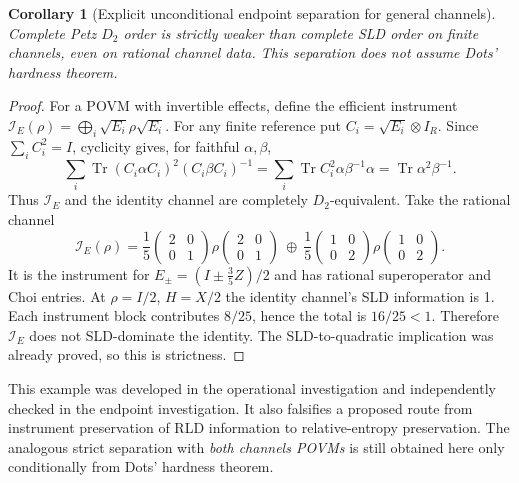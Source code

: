 \documentclass[11pt]{article}
\newtheorem{corollary}{Corollary}
\newcommand{\Tr}{\operatorname{Tr}}
\begin{document}
\begin{corollary}[Explicit unconditional endpoint separation for general channels]
Complete Petz $D_2$ order is strictly weaker than complete SLD order on finite
channels, even on rational channel data. This separation does not assume Dots'
hardness theorem.
\end{corollary}
\begin{proof}
For a POVM with invertible effects, define the efficient instrument
$\mathcal I_E(\rho)=\bigoplus_i\sqrt{E_i}\rho\sqrt{E_i}$.
For any finite reference put $C_i=\sqrt{E_i}\otimes I_R$.
Since $\sum_i C_i^2=I$, cyclicity gives, for faithful $\alpha,\beta$,
\[
 \sum_i\Tr(C_i\alpha C_i)^2(C_i\beta C_i)^{-1}
 =\sum_i\Tr C_i^2\alpha\beta^{-1}\alpha
 =\Tr\alpha^2\beta^{-1}.
\]
Thus $\mathcal I_E$ and the identity channel are completely $D_2$-equivalent.
Take the rational channel
\[
 \mathcal I_E(\rho)=\frac15
 \begin{pmatrix}2&0\\0&1\end{pmatrix}\rho
 \begin{pmatrix}2&0\\0&1\end{pmatrix}
 \ \oplus\ \frac15
 \begin{pmatrix}1&0\\0&2\end{pmatrix}\rho
 \begin{pmatrix}1&0\\0&2\end{pmatrix}.
\]
It is the instrument for $E_\pm=(I\pm\frac35 Z)/2$ and has rational
superoperator and Choi entries. At $\rho=I/2$, $H=X/2$ the identity channel's
SLD information is 1. Each instrument block contributes $8/25$, hence the
total is $16/25<1$. Therefore $\mathcal I_E$ does not SLD-dominate the identity.
The SLD-to-quadratic implication was already proved, so this is strictness.
\end{proof}
This example was developed in the operational investigation and independently
checked in the endpoint investigation. It also falsifies a proposed route
from instrument preservation of RLD information to relative-entropy
preservation. The analogous strict separation with \emph{both channels POVMs}
is still obtained here only conditionally from Dots' hardness theorem.
\end{document}
